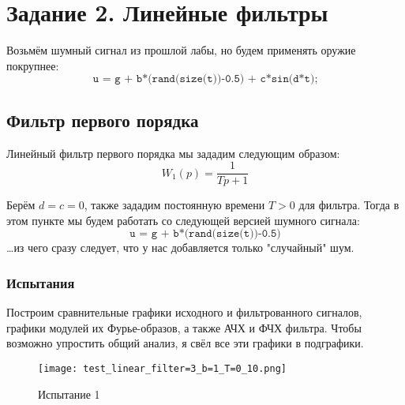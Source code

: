 \chapter{Задание 2. Линейные фильтры}
\label{ch:chap2}


\lstset{style=mystyle}

Возьмём шумный сигнал из прошлой лабы, но будем применять оружие покрупнее:
$$
\texttt{u = g + b*(rand(size(t))-0.5) + c*sin(d*t);}
$$

\section{Фильтр первого порядка}
Линейный фильтр первого порядка мы зададим следующим образом:
$$ W_1(p)=\frac{1}{Tp + 1}$$

Берём $d=c=0$, также зададим постоянную времени $T > 0$ для фильтра. Тогда в этом пункте мы будем работать со следующей версией шумного сигнала:
$$\texttt{u = g + b*(rand(size(t))-0.5)}$$
\dots из чего сразу следует, что у нас добавляется только "случайный" шум.

\subsection{Испытания}
Построим сравнительные графики исходного и фильтрованного сигналов, графики модулей их Фурье-образов, а также АЧХ  и ФЧХ фильтра. 
Чтобы возможно упростить общий анализ, я свёл все эти графики в подграфики.


\begin{figure}[ht]
    \centering
    \texttt{[image: test\_linear\_filter=3\_b=1\_T=0\_10.png]}
	\caption{Испытание 1}
\end{figure}

